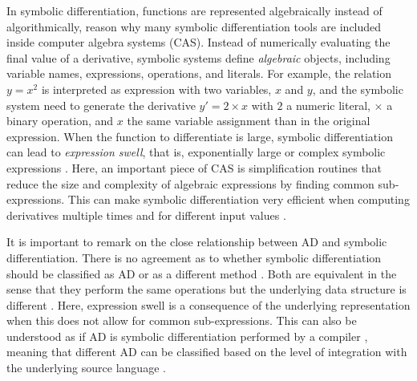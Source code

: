 In symbolic differentiation, functions are represented algebraically instead of algorithmically, reason why many symbolic differentiation tools are included inside computer algebra systems (CAS)\cite{Symbolics_jl_2022}. 
Instead of numerically evaluating the final value of a derivative, symbolic systems define \textit{algebraic} objects, including variable names, expressions, operations, and literals. 
For example, the relation $y = x^2$ is interpreted as expression with two variables, $x$ and $y$, and the symbolic system need to generate the derivative $y' = 2 \times x$ with $2$ a numeric literal, $\times$ a binary operation, and $x$ the same variable assignment than in the original expression.
When the function to differentiate is large, symbolic differentiation can lead to \textit{expression swell}, that is, exponentially large or complex symbolic expressions \cite{Baydin_Pearlmutter_Radul_Siskind_2015}.
Here, an important piece of CAS is simplification routines that reduce the size and complexity of algebraic expressions by finding common sub-expressions.  
This can make symbolic differentiation very efficient when computing derivatives multiple times and for different input values \cite{Dürrbaum_Klier_Hahn_2002}. 

It is important to remark on the close relationship between AD and symbolic differentiation.
There is no agreement as to whether symbolic differentiation should be classified as AD\cite{juedes1991taxonomy, Elliott_2018, Laue2020} or as a different method \cite{Baydin_Pearlmutter_Radul_Siskind_2015}.  
Both are equivalent in the sense that they perform the same operations but the underlying data structure is different \cite{Laue2020}. 
Here, expression swell is a consequence of the underlying representation when this does not allow for common sub-expressions. 
This can also be understood as if AD is symbolic differentiation performed by a compiler \cite{Elliott_2018}, meaning that different AD can be classified based on the level of integration with the underlying source language \cite{juedes1991taxonomy}.



